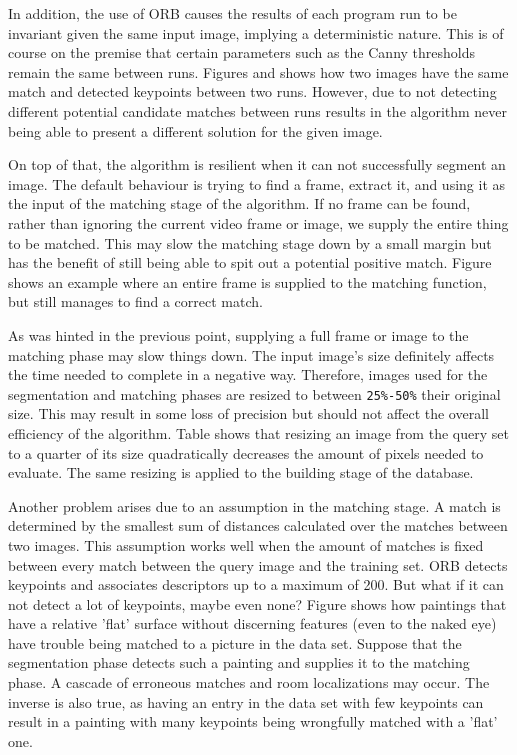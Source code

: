 In addition, the use of ORB causes the results of each program run to be invariant given the same input image, implying a deterministic nature. This is of course on the premise that certain parameters such as the Canny thresholds remain the same between runs. Figures  and  shows how two images have the same match and detected keypoints between two runs. However, due to not detecting different potential candidate matches between runs results in the algorithm never being able to present a different solution for the given image.


On top of that, the algorithm is resilient when it can not successfully segment an image. The default behaviour is trying to find a frame, extract it, and using it as the input of the matching stage of the algorithm. If no frame can be found, rather than ignoring the current video frame or image, we supply the entire thing to be matched. This may slow the matching stage down by a small margin but has the benefit of still being able to spit out a potential positive match. Figure  shows an example where an entire frame is supplied to the matching function, but still manages to find a correct match.


As was hinted in the previous point, supplying a full frame or image to the matching phase may slow things down. The input image's size definitely affects the time needed to complete in a negative way. Therefore, images used for the segmentation and matching phases are resized to between \verb|25%-50%| their original size. This may result in some loss of precision but should not affect the overall efficiency of the algorithm. Table  shows that resizing an image from the query set to a quarter of its size quadratically decreases the amount of pixels needed to evaluate. The same resizing is applied to the building stage of the database.


Another problem arises due to an assumption in the matching stage. A match is determined by the smallest sum of distances calculated over the matches between two images. This assumption works well when the amount of matches is fixed between every match between the query image and the training set. ORB detects keypoints and associates descriptors up to a maximum of 200. But what if it can not detect a lot of keypoints, maybe even none? Figure  shows how paintings that have a relative 'flat' surface without discerning features (even to the naked eye) have trouble being matched to a picture in the data set. Suppose that the segmentation phase detects such a painting and supplies it to the matching phase. A cascade of erroneous matches and room localizations may occur. The inverse is also true, as having an entry in the data set with few keypoints can result in a painting with many keypoints being wrongfully matched with a 'flat' one.


